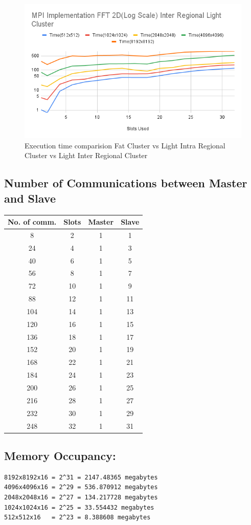 \documentclass{article}
\begin{document}
\begin{figure}[hb]
    \includegraphics[width=.48\textwidth]{MPI Implementation FFT 2D(Log Scale) Inter Regional Light Cluster.png}
    \caption{Execution time comparision Fat Cluster vs Light Intra Regional Cluster vs Light Inter Regional Cluster}\label{fig:foobar}
\end{figure}
\newpage
\subsection{Number of Communications between Master and Slave}

\begin{tabular}{|c|c|c|c|}
\hline
No. of comm. & Slots & Master & Slave \\
\hline
8   & 2 & 1 & 1 \\
\hline
24  & 4 & 1 & 3 \\
\hline
40  & 6 & 1 & 5 \\
\hline
56  & 8 & 1 & 7 \\
\hline
72  & 10 & 1 & 9 \\
\hline
88  & 12 & 1 & 11 \\
\hline
104  & 14 & 1 & 13 \\
\hline
120  & 16 & 1 & 15 \\
\hline
136  & 18 & 1 & 17 \\
\hline
152  & 20 & 1 & 19 \\
\hline
168  & 22 & 1 & 21 \\
\hline
184  & 24 & 1 & 23 \\
\hline
200 & 26 & 1 & 25 \\
\hline
216 & 28 & 1 & 27 \\
\hline
232 & 30 & 1 & 29 \\
\hline
248 & 32 & 1 & 31 \\
\hline
\end{tabular}



\subsection{Memory Occupancy: }
\begin{verbatim}
8192x8192x16 = 2^31 = 2147.48365 megabytes
4096x4096x16 = 2^29 = 536.870912 megabytes
2048x2048x16 = 2^27 = 134.217728 megabytes
1024x1024x16 = 2^25 = 33.554432 megabytes
512x512x16   = 2^23 = 8.388608 megabytes    
\end{verbatim}
\end{document}
